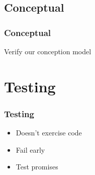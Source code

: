 \subsection{Conceptual}

\begin{frame}
    \frametitle{Conceptual}
    \Huge{Verify our conception model}
\end{frame}

\section{Testing}

\begin{frame}
    \frametitle{Testing}
    \begin{itemize}
        \item Doesn't exercise code
        \pause \item Fail early
        \pause \item Test promises
    \end{itemize}
\end{frame}


